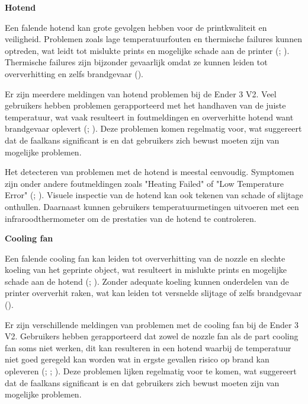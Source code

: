 \documentclass{article}
\begin{document}
\textbf{Hotend}

Een falende hotend kan grote gevolgen hebben voor de printkwaliteit en veiligheid. Problemen zoals lage temperatuurfouten en thermische failures kunnen optreden, wat leidt tot mislukte prints en mogelijke schade aan de printer (; ). Thermische failures zijn bijzonder gevaarlijk omdat ze kunnen leiden tot oververhitting en zelfs brandgevaar ().

Er zijn meerdere meldingen van hotend problemen bij de Ender 3 V2. Veel gebruikers hebben problemen gerapporteerd met het handhaven van de juiste temperatuur, wat vaak resulteert in foutmeldingen en oververhitte hotend want brandgevaar oplevert (; ). Deze problemen komen regelmatig voor, wat suggereert dat de faalkans significant is en dat gebruikers zich bewust moeten zijn van mogelijke problemen.

Het detecteren van problemen met de hotend is meestal eenvoudig. Symptomen zijn onder andere foutmeldingen zoals "Heating Failed" of "Low Temperature Error" (; ). Visuele inspectie van de hotend kan ook tekenen van schade of slijtage onthullen. Daarnaast kunnen gebruikers temperatuurmetingen uitvoeren met een infraroodthermometer om de prestaties van de hotend te controleren.

\textbf{Cooling fan}

Een falende cooling fan kan leiden tot oververhitting van de nozzle en slechte koeling van het geprinte object, wat resulteert in mislukte prints en mogelijke schade aan de hotend (; ). Zonder adequate koeling kunnen onderdelen van de printer oververhit raken, wat kan leiden tot versnelde slijtage of zelfs brandgevaar ().

Er zijn verschillende meldingen van problemen met de cooling fan bij de Ender 3 V2. Gebruikers hebben gerapporteerd dat zowel de nozzle fan als de part cooling fan soms niet werken, dit kan resulteren in een hotend waarbij de temperatuur niet goed geregeld kan worden wat in ergste gevallen risico op brand kan opleveren (; ; ). Deze problemen lijken regelmatig voor te komen, wat suggereert dat de faalkans significant is en dat gebruikers zich bewust moeten zijn van mogelijke problemen.
 
\end{document}
